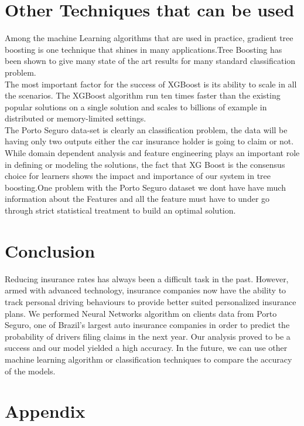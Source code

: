 \section{Other Techniques that can be used}

Among the machine Learning algorithms that are used in practice, gradient tree boosting is one technique that shines in many applications.Tree Boosting has been shown to give many state of the art results for many standard classification problem.
\\
The most important factor for the success of XGBoost is its ability to scale in all the scenarios. The XGBoost algorithm run ten times faster than the existing popular solutions on a single solution and scales to billions of example in distributed or memory-limited settings.
\\
The Porto Seguro data-set is clearly an classification problem, the data will be having only two outputs either the car insurance holder is going to claim or not.
\\
While domain dependent analysis and feature engineering plays an important role in defining or modeling the solutions, the fact that XG Boost is the consensus choice for learners shows the impact and importance  of our system in tree boosting.One problem with the Porto Seguro dataset we dont have have much information about the Features and all the feature must have to under go through strict statistical treatment to build an optimal solution.

\section{Conclusion}

Reducing insurance rates has always been a difficult task in the past. However, armed with advanced technology, insurance companies now have the ability to track personal driving behaviours to provide better suited personalized insurance plans. We performed Neural Networks algorithm on clients data from Porto Seguro, one of Brazil's largest auto insurance companies in order to predict the probability of drivers filing claims in the next year. Our analysis proved to be a success and our model yielded a high accuracy. In the future, we can use other machine learning algorithm or classification techniques to compare the accuracy of the models. 


\section{Appendix}
